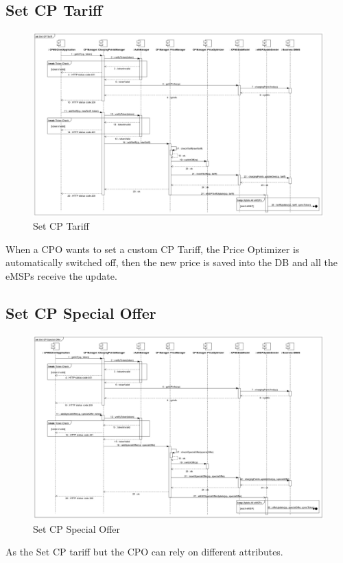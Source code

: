 \documentclass{Configuration_Files/PoliMi3i_thesis}
\begin{document}
\subsection{Set CP Tariff}
\begin{figure}[H]
    \centering
    \includegraphics[width=1\textwidth]{Images/sequenceDiagrams/Set CP Tariff.jpg}
    \caption{Set CP Tariff}
\end{figure}
When a CPO wants to set a custom CP Tariff, the Price Optimizer is automatically switched off, then the new price is saved into the DB and all the eMSPs receive the update.

\subsection{Set CP Special Offer}
\begin{figure}[H]
    \centering
    \includegraphics[width=1\textwidth]{Images/sequenceDiagrams/Set CP Special Offer.jpg}
    \caption{Set CP Special Offer}
\end{figure}
As the Set CP tariff but the CPO can rely on different attributes.
\end{document}
